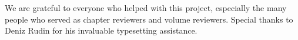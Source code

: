 \begin{refsection}

We are grateful to everyone who helped with this project, especially the many people who served as chapter reviewers and volume reviewers. Special thanks to Deniz Rudin for his invaluable typesetting assistance. 

\printbibliography[heading=subbibliography]
\end{refsection}

